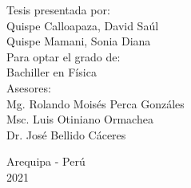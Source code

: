\begin{titlepage}
    \begin{spacing}{1}
    	\epigraph{Tesis presentada por:\\
    	Quispe Calloapaza, David Saúl\\
    	Quispe Mamani, Sonia Diana\\
    	\vspace{3mm}
    	Para optar el grado de:\\ Bachiller en Física\\
    	\vspace{3mm}
    	Asesores:\\
    	Mg. Rolando Moisés Perca Gonzáles\\
    	Msc. Luis Otiniano Ormachea\\
    	Dr. José Bellido Cáceres}{}
	
	\begin{center}
		Arequipa - Perú\\
		2021
	\end{center}
	\end{spacing}
\end{titlepage}